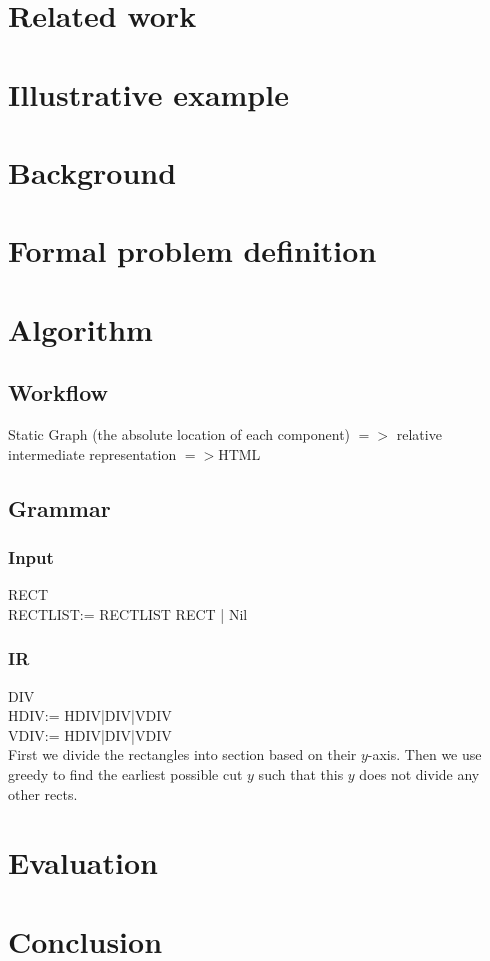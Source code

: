 \documentclass[runningheads]{llncs}
\begin{document}
\section{Related work}

\section{Illustrative example}
\section{Background}
\section{Formal problem definition}
\section{Algorithm}
\subsection{Workflow}
Static Graph (the absolute location of each component) $=>$ relative intermediate representation $=>$HTML
\subsection{Grammar}
\subsubsection{Input}
RECT\\
RECTLIST:= RECTLIST RECT | Nil
\subsubsection{IR}
DIV\\
HDIV:= HDIV|DIV|VDIV\\
VDIV:= HDIV|DIV|VDIV\\
First we divide the rectangles into section based on their $y$-axis. Then we use
greedy to find the earliest possible cut $y$ such that this $y$ does not divide any
other rects.


\section{Evaluation}
\section{Conclusion}
\end{document}
